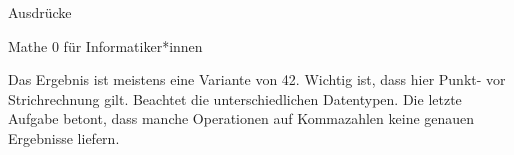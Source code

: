 \begin{task}[points=auto]{Ausdrücke }
\begin{subtask*}[points=0]{Mathe 0 für Informatiker*innen}
        \begin{multicols}{3}
        \end{multicols}


        \begin{solution}
            Das Ergebnis ist meistens eine Variante von 42.
            Wichtig ist, dass hier Punkt- vor Strichrechnung gilt.
            Beachtet die unterschiedlichen Datentypen.
            Die letzte Aufgabe betont, dass manche Operationen auf Kommazahlen keine genauen Ergebnisse liefern.
        \end{solution}
    \end{subtask*}
\end{task}
